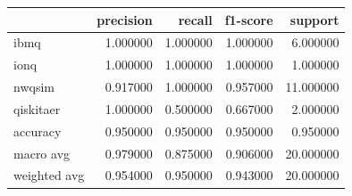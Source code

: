 \begin{tabular}{lrrrr}
\toprule
 & precision & recall & f1-score & support \\
\midrule
ibmq & 1.000000 & 1.000000 & 1.000000 & 6.000000 \\
ionq & 1.000000 & 1.000000 & 1.000000 & 1.000000 \\
nwqsim & 0.917000 & 1.000000 & 0.957000 & 11.000000 \\
qiskitaer & 1.000000 & 0.500000 & 0.667000 & 2.000000 \\
accuracy & 0.950000 & 0.950000 & 0.950000 & 0.950000 \\
macro avg & 0.979000 & 0.875000 & 0.906000 & 20.000000 \\
weighted avg & 0.954000 & 0.950000 & 0.943000 & 20.000000 \\
\bottomrule
\end{tabular}
